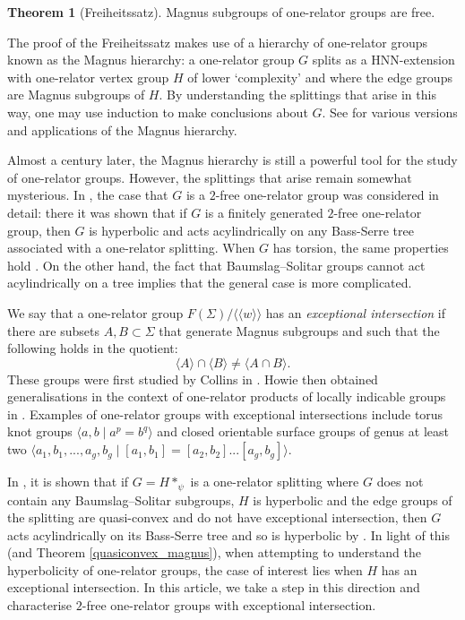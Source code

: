 \documentclass[11pt, a4paper]{amsart}
\theoremstyle{definition}
\newtheorem*{theorem*}{Theorem}
\newcommand{\normal}[1]{\langle\langle #1 \rangle\rangle}
\begin{document}
\begin{theorem*}[Freiheitssatz]
Magnus subgroups of one-relator groups are free.
\end{theorem*}

The proof of the Freiheitssatz makes use of a hierarchy of one-relator groups known as the Magnus hierarchy: a one-relator group $G$ splits as a HNN-extension with one-relator vertex group $H$ of lower `complexity' and where the edge groups are Magnus subgroups of $H$. By understanding the splittings that arise in this way, one may use induction to make conclusions about $G$. See \cite{magnus_04,lyn_00,me_22} for various versions and applications of the Magnus hierarchy. 

Almost a century later, the Magnus hierarchy is still a powerful tool for the study of one-relator groups. However, the splittings that arise remain somewhat mysterious. In \cite{me_22}, the case that $G$ is a $2$-free one-relator group was considered in detail: there it was shown that if $G$ is a finitely generated $2$-free one-relator group, then $G$ is hyperbolic and acts acylindrically on any Bass-Serre tree associated with a one-relator splitting. When $G$ has torsion, the same properties hold \cite{newman_68,wise_21,me_22}. On the other hand, the fact that Baumslag--Solitar groups cannot act acylindrically on a tree \cite{minasyan_15} implies that the general case is more complicated.

We say that a one-relator group $F(\Sigma)/\normal{w}$ has an \emph{exceptional intersection} if there are subsets $A, B\subset \Sigma$ that generate Magnus subgroups and such that the following holds in the quotient:
\[
\langle A\rangle\cap \langle B\rangle \neq \langle A\cap B\rangle.
\]
These groups were first studied by Collins in \cite{collins_04}. Howie then obtained generalisations in the context of one-relator products of locally indicable groups in \cite{howie_05}. Examples of one-relator groups with exceptional intersections include torus knot groups $\langle a, b\mid a^p = b^q\rangle$ and closed orientable surface groups of genus at least two $\langle a_1, b_1, ..., a_g, b_g \mid [a_1, b_1] = [a_2, b_2]...[a_g, b_g]\rangle$.

In \cite{me_22}, it is shown that if $G = H*_{\psi}$ is a one-relator splitting where $G$ does not contain any Baumslag--Solitar subgroups, $H$ is hyperbolic and the edge groups of the splitting are quasi-convex and do not have exceptional intersection, then $G$ acts acylindrically on its Bass-Serre tree and so is hyperbolic by \cite{bestvina_92_combination}. In light of this (and Theorem \ref{quasiconvex_magnus}), when attempting to understand the hyperbolicity of one-relator groups, the case of interest lies when $H$ has an exceptional intersection. In this article, we take a step in this direction and characterise $2$-free one-relator groups with exceptional intersection.
\end{document}
